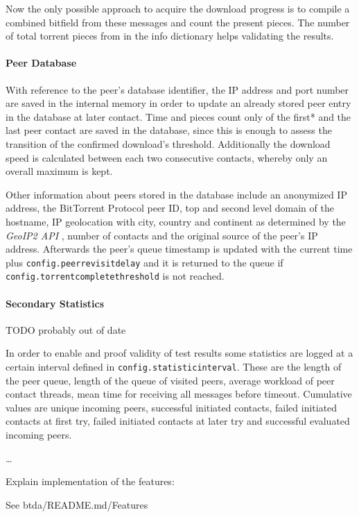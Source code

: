 \documentclass[10pt, a4paper, twoside, headsepline]{scrbook}
\renewcommand{\_}{\origunderscore\allowbreak}
\newcommand{\config}[1]{\texttt{config.\allowbreak #1}}
\begin{document}
Now the only possible approach to acquire the download progress is to compile a combined bitfield from these messages and count the present pieces. The number of total torrent pieces from in the info dictionary helps validating the results.

\paragraph{Peer Database}
With reference to the peer's database identifier, the IP address and port number are saved in the internal memory in order to update an already stored peer entry in the database at later contact. Time and pieces count only of the first* and the last peer contact are saved in the database, since this is enough to assess the transition of the confirmed download's threshold. Additionally the download speed is calculated between each two consecutive contacts, whereby only an overall maximum is kept.

Other information about peers stored in the database include an anonymized IP address, the BitTorrent Protocol peer ID, top and second level domain of the hostname, IP geolocation with city, country and continent as determined by the \emph{GeoIP2 API} \cite{geoip2-api}, number of contacts and the original source of the peer's IP address. Afterwards the peer's queue timestamp is updated with the current time plus \config{peer\_revisit\_delay} and it is returned to the queue if \config{torrent\_complete\_threshold} is not reached.

\paragraph{Secondary Statistics}
TODO probably out of date

In order to enable and proof validity of test results some statistics are logged at a certain interval defined in \config{statistic\_interval}. These are the length of the peer queue, length of the queue of visited peers, average workload of peer contact threads, mean time for receiving all messages before timeout. Cumulative values are unique incoming peers, successful initiated contacts, failed initiated contacts at first try, failed initiated contacts at later try and successful evaluated incoming peers.

\dots

\noindent\hrulefill

Explain implementation of the features:

See btda/README.md/Features
\end{document}

